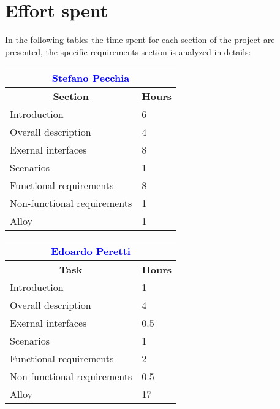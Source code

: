\chapter{Effort spent}
In the following tables the time spent for each section of the project are presented, the specific requirements section is analyzed in details:

\renewcommand\arraystretch{1.5}
\begin{table}[ht]
\centering
\begin{tabular}{|l|l|}
\multicolumn{2}{c}{\textcolor{Blue}{\textbf{Stefano Pecchia}}} \\\hline
\multicolumn{1}{|c|}{\textbf{Section}} & \multicolumn{1}{|c|}{\textbf{Hours}} \\\hline
    Introduction & 6  
    \\ \hline
    Overall description & 4  
    \\ \hline 
    Exernal interfaces & 8  
     \\ \hline 
    Scenarios & 1  
       \\ \hline 
    Functional requirements & 8  
      \\ \hline 
      Non-functional requirements & 1
      \\ \hline
    Alloy & 1
	\\ \hline
	\end{tabular} \hspace{2.5em}
	\begin{tabular}{|l|l|}
\multicolumn{2}{c}{\textcolor{Blue}{\textbf{Edoardo Peretti}}} \\\hline
\multicolumn{1}{|c|}{\textbf{Task}} & \multicolumn{1}{|c|}{\textbf{Hours}} \\\hline
    Introduction & 1
    \\ \hline
    Overall description & 4  
    \\ \hline 
    Exernal interfaces & 0.5
     \\ \hline 
    Scenarios & 1  
       \\ \hline 
    Functional requirements & 2
      \\ \hline 
      Non-functional requirements & 0.5
    \\ \hline
    Alloy & 17
	\\ \hline
\end{tabular}
\end{table}